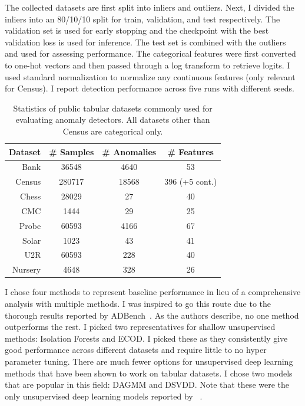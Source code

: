 The collected datasets are first split into inliers and outliers. Next, I divided the inliers into an 80/10/10 split for train, validation, and test respectively. The validation set is used for early stopping and the checkpoint with the best validation loss is used for inference. The test set is combined with the outliers and used for assessing performance. The categorical features were first converted to one-hot vectors and then passed through a log transform to retrieve logits. I used standard normalization to normalize any continuous features (only relevant for Census). I report detection performance across five runs with different seeds.

\begin{table}
    \centering
    \small
    \begin{tabular}{rccc}
      \toprule %
      \bfseries Dataset & \bfseries \# Samples & \bfseries \# Anomalies & \bfseries \# Features \\
      \midrule 
      Bank & 36548 & 4640 & 53 \\
      Census & 280717 & 18568 & 396 (+5 cont.)\\
      Chess & 28029 & 27 & 40 \\
      CMC & 1444 & 29 & 25 \\
      Probe & 60593 & 4166 & 67 \\
      Solar & 1023 & 43 & 41 \\
      U2R & 60593 & 228 & 40 \\
      Nursery & 4648 & 328 & 26 \\
      \bottomrule
    \end{tabular}
    \caption{Statistics of public tabular datasets commonly used for evaluating anomaly detectors. All datasets other than Census are categorical only.}\label{tab:data}
\end{table}

I chose four methods to represent baseline performance in lieu of a comprehensive analysis with multiple methods. I was inspired to go this route due to the thorough results reported by ADBench~\cite{han2022adbench}. As the authors describe, no one method outperforms the rest. I picked two representatives for shallow unsupervised methods: Isolation Forests and ECOD. I picked these as they consistently give good performance across different datasets and require little to no hyper parameter tuning. There are much fewer options for unsupervised deep learning methods that have been shown to work on tabular datasets. I chose two models that are popular in this field: DAGMM and DSVDD. Note that these were the only unsupervised deep learning models reported by ~\cite{han2022adbench}.

